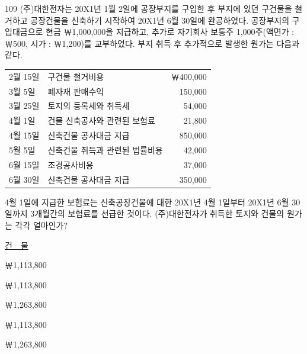 \begin{question}{109}
(주)대한전자는 20X1년 1월 2일에 공장부지를 구입한 후 부지에 있던 구건물을 철거하고 공장건물을 신축하기 시작하여 20X1년 6월 30일에 완공하였다. 공장부지의 구입대금으로 현금 ￦1,000,000을 지급하고, 추가로 자기회사 보통주 1,000주(액면가 : ￦500, 시가 : ￦1,200)를 교부하였다. 부지 취득 후 추가적으로 발생한 원가는 다음과 같다.

{\small\centering
\begin{tabular}{|llr|}
\hline
2월 15일 & 구건물 철거비용 & ￦400,000 \\
3월 5일 & 폐자재 판매수익 & 150,000 \\
3월 25일 & 토지의 등록세와 취득세 & 54,000 \\
4월 1일 & 건물 신축공사와 관련된 보험료 & 21,800 \\
4월 15일 & 신축건물 공사대금 지급 & 850,000 \\
5월 5일 & 신축건물 취득과 관련된 법률비용 & 42,000 \\
6월 15일 & 조경공사비용 & 37,000 \\
6월 30일 & 신축건물 공사대금 지급 & 350,000 \\
\hline
\end{tabular}\par}

4월 1일에 지급한 보험료는 신축공장건물에 대한 20X1년 4월 1일부터 20X1년 6월 30일까지 3개월간의 보험료를 선급한 것이다. (주)대한전자가 취득한 토지와 건물의 원가는 각각 얼마인가?

\noindent\hspace*{2em}\uline{건\ \ 물}\par
\begin{choices}
  \item {}￦1,113,800
  \item {}￦1,113,800
  \item {}￦1,263,800
  \item {}￦1,113,800
  \item {}￦1,263,800
\end{choices}
\end{question}
